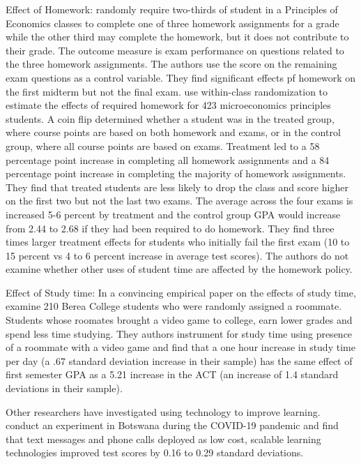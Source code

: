 \documentclass[12pt]{article}
\begin{document}
Effect of Homework: \textcite{ts2012} randomly require two-thirds of student in a Principles of Economics classes to complete one of three homework assignments for a grade while the other third may complete the homework, but it does not contribute to their grade. The outcome measure is exam performance on questions related to the three homework assignments. The authors use the score on the remaining exam questions as a control variable. They find significant effects pf homework on the first midterm but not the final exam. \textcite{gr2013} use within-class randomization to estimate the effects of required homework for 423 microeconomics principles students. A coin flip determined whether a student was in the treated group, where course points are based on both homework and exams, or in the control group, where all course points are based on exams. Treatment led to a 58 percentage point increase in completing all homework assignments and a 84 percentage point increase in completing the majority of homework assignments. They find that treated students are less likely to drop the class and score higher on the first two but not the last two exams. The average across the four exams is increased 5-6 percent by treatment and the control group GPA would increase from 2.44 to 2.68 if they had been required to do homework. They find three times larger treatment effects for students who initially fail the first exam (10 to 15 percent vs 4 to 6 percent increase in average test scores). The authors do not examine whether other uses of student time are affected by the homework policy.

Effect of Study time: In a convincing empirical paper on the effects of study time, \textcite{ss2008} examine 210 Berea College students who were randomly assigned a roommate. Students whose roomates brought a video game to college, earn lower grades and spend less time studying. They authors instrument for study time using presence of a roommate with a video game and find that a one hour increase in study time per day (a .67 standard deviation increase in their sample) has the same effect of first semester GPA as a 5.21 increase in the ACT (an increase of 1.4 standard deviations in their sample).

Other researchers have investigated using technology to improve learning. \textcite{abbm2020} conduct an experiment in Botswana during the COVID-19 pandemic and find that text messages and phone calls deployed as low cost, scalable learning technologies improved test scores by 0.16 to 0.29 standard deviations.
\end{document}
